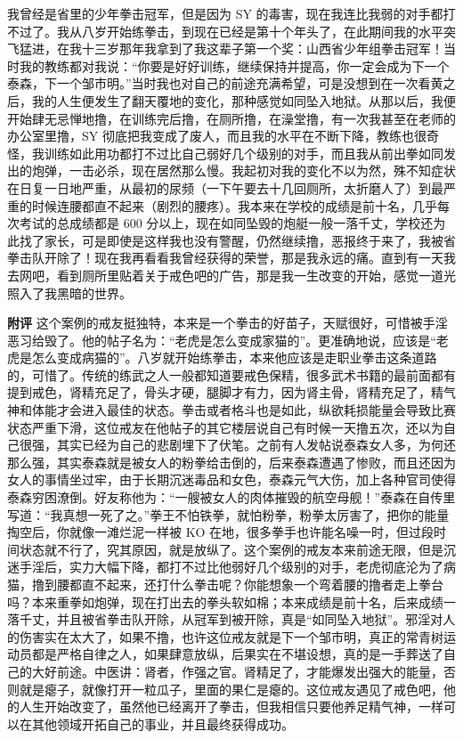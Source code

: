\begin{case}
    我曾经是省里的少年拳击冠军，但是因为 SY 的毒害，现在我连比我弱的对手都打不过了。我从八岁开始练拳击，到现在已经是第十个年头了，在此期间我的水平突飞猛进，在我十三岁那年我拿到了我这辈子第一个奖：山西省少年组拳击冠军！当时我的教练都对我说：“你要是好好训练，继续保持并提高，你一定会成为下一个泰森，下一个邹市明。”当时我也对自己的前途充满希望，可是没想到在一次看黄之后，我的人生便发生了翻天覆地的变化，那种感觉如同坠入地狱。从那以后，我便开始肆无忌惮地撸，在训练完后撸，在厕所撸，在澡堂撸，有一次我甚至在老师的办公室里撸，SY 彻底把我变成了废人，而且我的水平在不断下降，教练也很奇怪，我训练如此用功都打不过比自己弱好几个级别的对手，而且我从前出拳如同发出的炮弹，一击必杀，现在居然那么慢。我起初对我的变化不以为然，殊不知症状在日复一日地严重，从最初的尿频（一下午要去十几回厕所，太折磨人了）到最严重的时候连腰都直不起来（剧烈的腰疼）。我本来在学校的成绩是前十名，几乎每次考试的总成绩都是 600 分以上，现在如同坠毁的炮艇一般一落千丈，学校还为此找了家长，可是即使是这样我也没有警醒，仍然继续撸，恶报终于来了，我被省拳击队开除了！现在我再看看我曾经获得的荣誉，那是我永远的痛。直到有一天我去网吧，看到厕所里贴着关于戒色吧的广告，那是我一生改变的开始，感觉一道光照入了我黑暗的世界。

    \textbf{附评} 这个案例的戒友挺独特，本来是一个拳击的好苗子，天赋很好，可惜被手淫恶习给毁了。他的帖子名为：“老虎是怎么变成家猫的”。更准确地说，应该是“老虎是怎么变成病猫的”。八岁就开始练拳击，本来他应该是走职业拳击这条道路的，可惜了。传统的练武之人一般都知道要戒色保精，很多武术书籍的最前面都有提到戒色，肾精充足了，骨头才硬，腿脚才有力，因为肾主骨，肾精充足了，精气神和体能才会进入最佳的状态。拳击或者格斗也是如此，纵欲耗损能量会导致比赛状态严重下滑，这位戒友在他帖子的其它楼层说自己有时候一天撸五次，还以为自己很强，其实已经为自己的悲剧埋下了伏笔。之前有人发帖说泰森女人多，为何还那么强，其实泰森就是被女人的粉拳给击倒的，后来泰森遭遇了惨败，而且还因为女人的事情坐过牢，由于长期沉迷毒品和女色，泰森元气大伤，加上各种官司使得泰森穷困潦倒。好友称他为：“一艘被女人的肉体摧毁的航空母舰！”泰森在自传里写道：“我真想一死了之。”拳王不怕铁拳，就怕粉拳，粉拳太厉害了，把你的能量掏空后，你就像一滩烂泥一样被 KO 在地，很多拳手也许能名噪一时，但过段时间状态就不行了，究其原因，就是放纵了。这个案例的戒友本来前途无限，但是沉迷手淫后，实力大幅下降，都打不过比他弱好几个级别的对手，老虎彻底沦为了病猫，撸到腰都直不起来，还打什么拳击呢？你能想象一个弯着腰的撸者走上拳台吗？本来重拳如炮弹，现在打出去的拳头软如棉；本来成绩是前十名，后来成绩一落千丈，并且被省拳击队开除，从冠军到被开除，真是“如同坠入地狱”。邪淫对人的伤害实在太大了，如果不撸，也许这位戒友就是下一个邹市明，真正的常青树运动员都是严格自律之人，如果肆意放纵，后果实在不堪设想，真的是一手葬送了自己的大好前途。中医讲：肾者，作强之官。肾精足了，才能爆发出强大的能量，否则就是瘪子，就像打开一粒瓜子，里面的果仁是瘪的。这位戒友遇见了戒色吧，他的人生开始改变了，虽然他已经离开了拳击，但我相信只要他养足精气神，一样可以在其他领域开拓自己的事业，并且最终获得成功。
\end{case}

